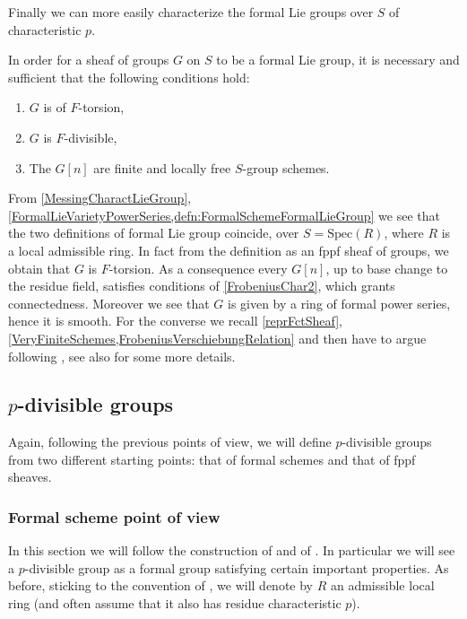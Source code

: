 \documentclass[../Main]{subfiles}
\begin{document}
Finally we can more easily characterize the formal Lie groups over
$S$ of characteristic $p$.
\begin{thm}\label{MessingCharactLieGroup}
	In order for a sheaf of groups $G$ on $S$ to be a formal Lie group,
	it is necessary and sufficient that the following conditions hold:
\begin{enumerate}
	\item $G$ is of $F$-torsion,
	\item $G$ is $F$-divisible,
	\item The $G[n]$ are finite and locally free $S$-group schemes.
\end{enumerate}
\end{thm}


\begin{rem}
	From 
	\cref{MessingCharactLieGroup},
	\cref{FormalLieVarietyPowerSeries,defn:FormalSchemeFormalLieGroup}
	we see that the two definitions of formal Lie group coincide, over
	$S = \mathrm{Spec}(R)$, where $R$ is a local admissible ring.
	In fact from the definition as an fppf sheaf of groups,
	we obtain that $G$ is $F$-torsion.
	As a consequence every $G[n]$, up to base
	change to the residue field, satisfies conditions of \cref{FrobeniusChar2},
	which grants connectedness.
	Moreover we see that $G$ is given by a ring of formal power series,
	hence it is smooth.
	For the converse we recall
	\cref{reprFctSheaf},
	\cref{VeryFiniteSchemes,FrobeniusVerschiebungRelation}
	and then have to argue following \cite[porposition 1]{TatePC}, see
	also \cite[\S2, theorem 2.1.7]{Messing} for some more details.
\end{rem}



\subsection{\texorpdfstring{$p$}{p}-divisible groups}
Again, following the previous points of view, we will define $p$-divisible groups
from two different starting points: that of formal schemes
and that of fppf sheaves.



\subsubsection{Formal scheme point of view}
In this section we will follow the construction of \cite[\S2]{TatePC} and
of \cite[\S6]{Shatz}. 
In particular we will see a $p$-divisible group as a formal group
satisfying certain important properties.
As before, sticking to the convention of \cite{Shatz}, we will 
denote by $R$ an admissible local ring (and often assume that
it also has residue characteristic $p$).
\end{document}
